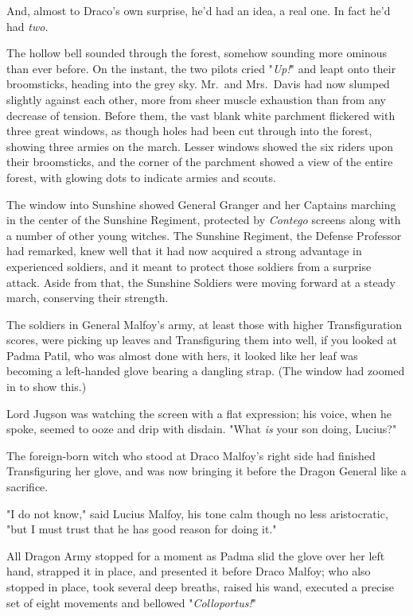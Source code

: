 And, almost to Draco's own surprise, he'd had an idea, a real one. In fact he'd
had \emph{two.}

The hollow bell sounded through the forest, somehow sounding more ominous than
ever before. On the instant, the two pilots cried "\emph{Up!}" and leapt onto
their broomsticks, heading into the grey sky.
\sbreak
Mr.~and Mrs.~Davis had now slumped slightly against each other, more from sheer
muscle exhaustion than from any decrease of tension. Before them, the vast
blank white parchment flickered with three great windows, as though holes had
been cut through into the forest, showing three armies on the march. Lesser
windows showed the six riders upon their broomsticks, and the corner of the
parchment showed a view of the entire forest, with glowing dots to indicate
armies and scouts.

The window into Sunshine showed General Granger and her Captains marching in
the center of the Sunshine Regiment, protected by \emph{Contego} screens along
with a number of other young witches. The Sunshine Regiment, the Defense
Professor had remarked, knew well that it had now acquired a strong advantage
in experienced soldiers, and it meant to protect those soldiers from a surprise
attack. Aside from that, the Sunshine Soldiers were moving forward at a steady
march, conserving their strength.

The soldiers in General Malfoy's army, at least those with higher
Transfiguration scores, were picking up leaves and Transfiguring them
into{\el} well, if you looked at Padma Patil, who was almost done with hers,
it looked like her leaf was becoming a left-handed glove bearing a dangling
strap. (The window had zoomed in to show this.)

Lord Jugson was watching the screen with a flat expression; his voice, when he
spoke, seemed to ooze and drip with disdain. "What \emph{is} your son doing,
Lucius?"

The foreign-born witch who stood at Draco Malfoy's right side had finished
Transfiguring her glove, and was now bringing it before the Dragon General like
a sacrifice.

"I do not know," said Lucius Malfoy, his tone calm though no less aristocratic,
"but I must trust that he has good reason for doing it."

All Dragon Army stopped for a moment as Padma slid the glove over her left
hand, strapped it in place, and presented it before Draco Malfoy; who also
stopped in place, took several deep breaths, raised his wand, executed a
precise set of eight movements and bellowed "\emph{Colloportus!}"

